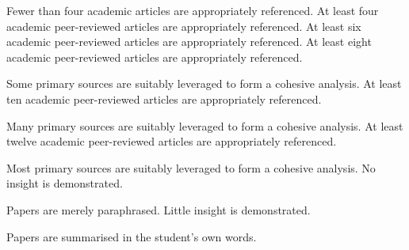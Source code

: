 \documentclass{../../fal_assignment}
\begin{document}
\rubricyeartwo

\begin{markingrubric}
%
%
%
%
        \grade\fail	Fewer than four academic articles are appropriately referenced.
        \grade		At least four academic peer-reviewed articles are appropriately referenced.
        \grade		At least six academic peer-reviewed articles are appropriately referenced.
        \grade		At least eight academic peer-reviewed articles are appropriately referenced.
        \par 		Some primary sources are suitably leveraged to form a cohesive analysis.
        \grade		At least ten academic peer-reviewed articles are appropriately referenced.
        \par 		Many primary sources are suitably leveraged to form a cohesive analysis.
        \grade		At least twelve academic peer-reviewed articles are appropriately referenced.
        \par 		Most primary sources are suitably leveraged to form a cohesive analysis.
%
        \grade\fail No insight is demonstrated.
        \par		Papers are merely paraphrased.
        \grade		Little insight is demonstrated.
        \par		Papers are summarised in the student's own words.

\end{markingrubric}
\end{document}
